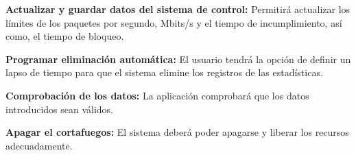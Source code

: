 \begin{functional}
        \setcounter{enumi}{14}
        \item \textbf{Actualizar y guardar datos del sistema de control:} Permitirá actualizar los límites de los paquetes por segundo, Mbits/s y el tiempo de incumplimiento, así como, el tiempo de bloqueo.
        \item \textbf{Programar eliminación automática:} El usuario tendrá la opción de definir un lapso de tiempo para que el sistema elimine los registros de las estadísticas.
        \item \textbf{Comprobación de los datos:} La aplicación comprobará que los datos introducidos sean válidos.
        \item \textbf{Apagar el cortafuegos:} El sistema deberá poder apagarse y liberar los recursos adecuadamente.
\end{functional}


